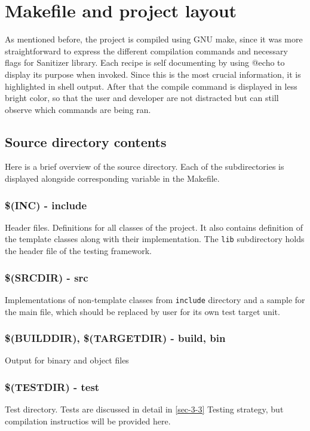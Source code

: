 \documentclass{elteikthesis}[2018/06/06]
\begin{document}
\section{Makefile and project layout}
\label{sec-3-2}
As mentioned before, the project is compiled using GNU make, since it was more straightforward to express the different compilation commands and necessary flags for Sanitizer library. Each recipe is self documenting by using @echo to display its purpose when invoked. Since this is the most crucial information, it is highlighted in shell output. After that the compile command is displayed in less bright color, so that the user and developer are not distracted but can still observe which commands are being ran. \\
\subsection{Source directory contents}
\label{sec-3-2-1}
Here is a brief overview of the source directory. Each of the subdirectories is displayed alongside corresponding variable in the Makefile. \\

\subsubsection{\$(INC) - include}
\label{sec-3-2-1-1}
Header files. Definitions for all classes of the project. It also contains definition of the template classes along with their implementation. The \lstinline{lib} subdirectory holds the header file of the testing framework. \\
\subsubsection{\$(SRCDIR) - src}
\label{sec-3-2-1-2}
Implementations of non-template classes from \lstinline{include} directory and a sample for the main file, which should be replaced by user for its own test target unit. \\
\subsubsection{\$(BUILDDIR), \$(TARGETDIR) - build, bin}
\label{sec-3-2-1-3}
Output for binary and object files \\
\subsubsection{\$(TESTDIR) - test}
\label{sec-3-2-1-4}
Test directory. Tests are discussed in detail in \ref{sec-3-3} Testing strategy, but compilation instructios will be provided here. \\
\end{document}
